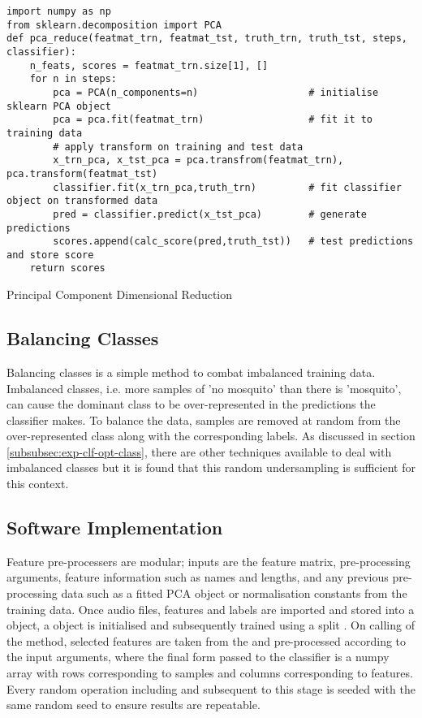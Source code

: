         \begin{listing}[ht]
            \begin{verbatim}
import numpy as np
from sklearn.decomposition import PCA
def pca_reduce(featmat_trn, featmat_tst, truth_trn, truth_tst, steps, classifier):
    n_feats, scores = featmat_trn.size[1], []
    for n in steps:
        pca = PCA(n_components=n)                   # initialise sklearn PCA object
        pca = pca.fit(featmat_trn)                  # fit it to training data
        # apply transform on training and test data
        x_trn_pca, x_tst_pca = pca.transfrom(featmat_trn), pca.transform(featmat_tst)
        classifier.fit(x_trn_pca,truth_trn)         # fit classifier object on transformed data
        pred = classifier.predict(x_tst_pca)        # generate predictions
        scores.append(calc_score(pred,truth_tst))   # test predictions and store score
    return scores
            \end{verbatim}
            \caption{Principal Component Dimensional Reduction}
            \label{code:pl-featpreproc-sel-pca}
        \end{listing} 
    
    \subsection{Balancing Classes}
    \label{subsec:pl-featpreproc-bal}
        Balancing classes is a simple method to combat imbalanced training data. Imbalanced classes, i.e. more samples of 'no mosquito' than there is 'mosquito', can cause the dominant class to be over-represented in the predictions the classifier makes. To balance the data, samples are removed at random from the over-represented class along with the corresponding labels. As discussed in section \ref{subsubsec:exp-clf-opt-class}, there are other techniques available to deal with imbalanced classes but it is found that this random undersampling is sufficient for this context.
    
    \subsection{Software Implementation}
    \label{subsec:pl-featpreproc-software}
        Feature pre-processers are modular; inputs are the feature matrix, pre-processing arguments, feature information such as names and lengths, and any previous pre-processing data such as a fitted PCA object or normalisation constants from the training data.
        Once audio files, features and labels are imported and stored into a  object, a  object is initialised and subsequently trained using a split . On calling of the  method, selected features are taken from the  and pre-processed according to the input arguments, where the final form passed to the classifier is a numpy array with rows corresponding to samples and columns corresponding to features. Every random operation including and subsequent to this stage is seeded with the same random seed to ensure results are repeatable.
    